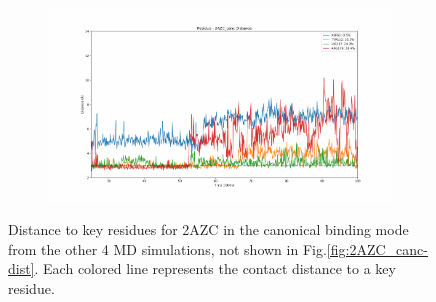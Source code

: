 \begin{figure}[!ht]
\begin{subfigure}{.45\textwidth}
  \end{subfigure}
    \begin{subfigure}{.45\textwidth}
     \centering
     \includegraphics[width=.95\linewidth]{chapter4/2AZC_canc/2AZC_canc-dist_4.pdf}
  \end{subfigure}
\caption[Key residue distances for $2AZC_{canc}$]{Distance to key residues for 2AZC in the canonical binding mode from the other 4 MD simulations, not shown in Fig.\ref{fig:2AZC_canc-dist}. Each colored line represents the contact distance to a key residue.}
\label{sup:2AZC_canc-dist}
\end{figure}  


